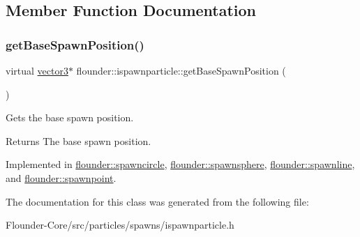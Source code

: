 \subsection{Member Function Documentation}
\mbox{\label{classflounder_1_1ispawnparticle_a3e59019906bbb5ba8df82a4f6e847ef6}} 
\subsubsection{\texorpdfstring{get\+Base\+Spawn\+Position()}{getBaseSpawnPosition()}}
{\footnotesize\ttfamily virtual \hyperlink{classflounder_1_1vector3}{vector3}$\ast$ flounder\+::ispawnparticle\+::get\+Base\+Spawn\+Position (\begin{DoxyParamCaption}{ }\end{DoxyParamCaption})\hspace{0.3cm}{\ttfamily [pure virtual]}}



Gets the base spawn position. 

\begin{DoxyReturn}{Returns}
The base spawn position. 
\end{DoxyReturn}


Implemented in \hyperlink{classflounder_1_1spawncircle_a1a637319942ae68475e7b0b0f3e0a739}{flounder\+::spawncircle}, \hyperlink{classflounder_1_1spawnsphere_ac5ae227a5bff13da4e0fac4ba4debdd4}{flounder\+::spawnsphere}, \hyperlink{classflounder_1_1spawnline_a264fd2342ff51355bfd5e3fa2235bc9b}{flounder\+::spawnline}, and \hyperlink{classflounder_1_1spawnpoint_a6c1f80efbeb2ff178c9227855e069ea8}{flounder\+::spawnpoint}.



The documentation for this class was generated from the following file\+:\begin{DoxyCompactItemize}
\item 
Flounder-\/\+Core/src/particles/spawns/ispawnparticle.\+h\end{DoxyCompactItemize}
